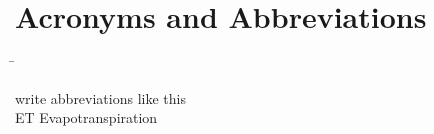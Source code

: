  \setcounter{tocdepth}{4}
 \tableofcontents

 \cleardoublepage


\chapter*{Acronyms and Abbreviations}\label{chap:symbole}


\begin{tabbing}
 \hspace*{3.2cm}  \= \kill

write abbreviations like this\\
ET\> Evapotranspiration\\



\end{tabbing}

 \cleardoublepage

